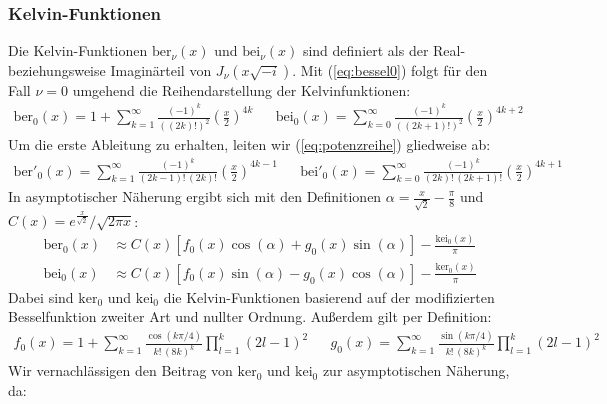 \documentclass[10pt,a4paper]{article}
\begin{document}
\subsubsection{Kelvin-Funktionen}
\label{sssec:kelvin-funktionen}

Die Kelvin-Funktionen $\mathrm{ber}_\nu(x)$ und $\mathrm{bei}_\nu(x)$ sind definiert als der Real-
beziehungsweise Imaginärteil von $J_\nu(x \sqrt{-i} )$. Mit (\ref{eq:bessel0})
folgt für den Fall $\nu = 0$ umgehend die Reihendarstellung der Kelvinfunktionen:
\begin{align}
	\mathrm{ber}_0(x) = 1 + \sum^{\infty}_{k=1} \frac{\left( -1 \right)^k}{\left( \left(2k\right)! \right)^2} \left( \frac{x}{2} \right)^{4k}&&
	\mathrm{bei}_0(x) = \sum^{\infty}_{k=0} \frac{\left( -1 \right)^k}{\left( \left(2k+1\right)! \right)^2} \left( \frac{x}{2} \right)^{4k+2}\label{eq:potenzreihe}
\end{align}
Um die erste Ableitung zu erhalten, leiten wir (\ref{eq:potenzreihe}) gliedweise ab:
\begin{align}
	\mathrm{ber}'_0(x) = \sum^{\infty}_{k=1} \frac{\left( -1 \right)^k}{\left( 2k-1 \right)! \, \left( 2k \right)!} \left( \frac{x}{2} \right)^{4k-1}&&
	\mathrm{bei}'_0(x) = \sum^{\infty}_{k=0} \frac{\left( -1 \right)^k}{\left( 2k \right)! \, \left( 2k+1 \right)!} \left( \frac{x}{2} \right)^{4k+1}\label{eq:dpotenzreihe}
\end{align}
In asymptotischer Näherung \cite{abramowitzstegun} ergibt sich mit den Definitionen $\alpha = \frac{x}{\sqrt{2}}-\frac{\pi}{8}$ und $C(x) = e^{\frac{x}{\sqrt{2}}}/\sqrt{2 \pi x} $:
\begin{align}
	\mathrm{ber}_0(x) &\approx C(x) \left[f_0(x) \cos(\alpha) + g_0(x) \sin(\alpha) \right]\label{eq:berpotenzreiheasym}-\frac{\mathrm{kei}_0(x)}{\pi}\\
	\mathrm{bei}_0(x) &\approx C(x) \left[f_0(x) \sin(\alpha) - g_0(x) \cos(\alpha) \right]\label{eq:beipotenzreiheasym}-\frac{\mathrm{ker}_0(x)}{\pi}
\end{align}
Dabei sind $\mathrm{ker}_0$ und $\mathrm{kei}_0$ die Kelvin-Funktionen basierend auf der modifizierten Besselfunktion zweiter Art und nullter Ordnung.
Außerdem gilt per Definition:
\begin{align}
	f_0(x) = 1 + \sum^{\infty}_{k=1} \frac{\cos(k \pi / 4)}{k! \, (8k)^k} \prod^{k}_{l=1}(2l - 1)^2&&
	g_0(x) = \sum^{\infty}_{k=1} \frac{\sin(k \pi / 4)}{k! \, (8k)^k} \prod^{k}_{l=1}(2l - 1)^2\label{eq:f0g0}
\end{align}
Wir vernachlässigen den Beitrag von $\mathrm{ker}_0$ und $\mathrm{kei}_0$ zur asymptotischen Näherung, da:
\end{document}
